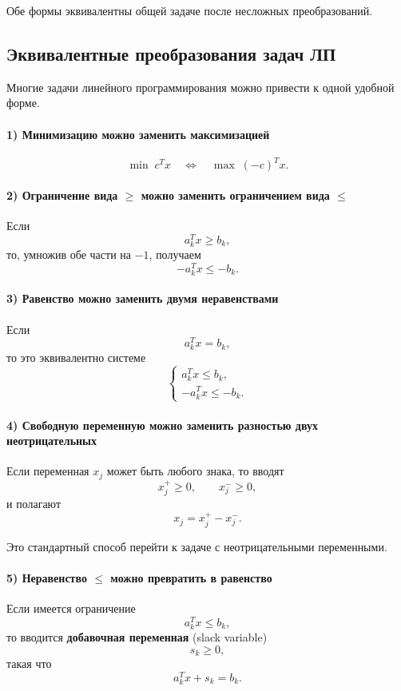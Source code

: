 	Обе формы эквивалентны общей задаче после несложных преобразований.
	
	\subsection{Эквивалентные преобразования задач ЛП}
	
	Многие задачи линейного программирования можно привести к одной удобной форме.
	
	\paragraph{1) Минимизацию можно заменить максимизацией}
	\[
	\min \; c^T x
	\quad \Longleftrightarrow \quad
	\max \; (-c)^T x.
	\]
	
	\paragraph{2) Ограничение вида \texorpdfstring{$\ge$}{>=} можно заменить ограничением вида \texorpdfstring{$\le$}{<=}}
	Если
	\[
	a_k^T x \ge b_k,
	\]
	то, умножив обе части на \(-1\), получаем
	\[
	-a_k^T x \le -b_k.
	\]
	
	\paragraph{3) Равенство можно заменить двумя неравенствами}
	Если
	\[
	a_k^T x = b_k,
	\]
	то это эквивалентно системе
	\[
	\begin{cases}
		a_k^T x \le b_k,\\
		-a_k^T x \le -b_k.
	\end{cases}
	\]
	
	\paragraph{4) Свободную переменную можно заменить разностью двух неотрицательных}
	Если переменная \(x_j\) может быть любого знака, то вводят
	\[
	x_j^+ \ge 0, \qquad x_j^- \ge 0,
	\]
	и полагают
	\[
	x_j = x_j^+ - x_j^-.
	\]
	
	Это стандартный способ перейти к задаче с неотрицательными переменными.
	
	\paragraph{5) Неравенство \texorpdfstring{$\le$}{<=} можно превратить в равенство}
	Если имеется ограничение
	\[
	a_k^T x \le b_k,
	\]
	то вводится \textbf{добавочная переменная} (slack variable)
	\[
	s_k \ge 0,
	\]
	такая что
	\[
	a_k^T x + s_k = b_k.
	\]
	
